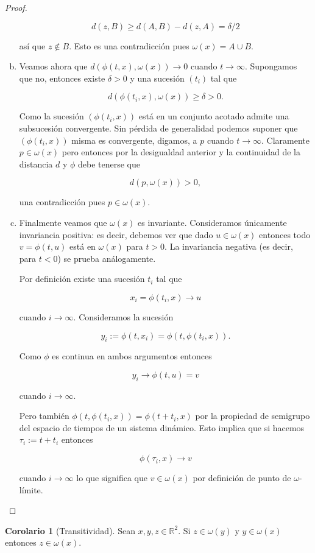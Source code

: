 \documentclass[11pt]{book}
\theoremstyle{definition}
\numberwithin{definition}{section}
\theoremstyle{theorem}
\newtheorem{corollary}{Corolario}
\numberwithin{theorem}{section}
\numberwithin{lemma}{section}
\numberwithin{corollary}{section}
\theoremstyle{plain}
\numberwithin{example}{section}
\newcommand{\R}{{\ensuremath{\mathbb{R}}}}
\begin{document}
\begin{proof}
\begin{enumerate}[(a)]
$$ d(z,B) \geq d(A,B) - d(z,A) = \delta/2$$

así que $z \notin B$. Esto es una contradicción pues $\omega(x) = A \cup B$.

\item Veamos ahora que $d(\phi(t,x), \omega(x)) \to 0$ cuando $t \to \infty$. Supongamos que no, entonces existe $\delta > 0$ y una sucesión $(t_i)$ tal que 

$$ d(\phi(t_i, x), \omega(x)) \geq \delta > 0.$$

Como la sucesión $(\phi(t_i, x))$ está en un conjunto acotado admite una subsucesión convergente. Sin pérdida de generalidad podemos suponer que $(\phi(t_i, x))$ misma es convergente, digamos, a $p$ cuando $t \to \infty$. Claramente $p \in \omega(x)$ pero entonces por la desigualdad anterior y la continuidad de la distancia $d$ y $\phi$ debe tenerse que

$$ d(p, \omega(x)) > 0,$$

una contradicción pues $p \in \omega(x)$.

\item Finalmente veamos que $\omega(x)$ es invariante. Consideramos únicamente invariancia positiva: es decir, debemos ver que dado $u \in \omega(x)$ entonces todo $v = \phi(t, u)$ está en $\omega(x)$ para $t > 0$. La invariancia negativa (es decir, para $t < 0$) se prueba análogamente.

Por definición existe una sucesión $t_i$ tal que

$$ x_i = \phi(t_i, x) \to u$$

cuando $i \to \infty$. Consideramos la sucesión

$$ y_i := \phi(t, x_i) = \phi(t, \phi(t_i, x)).$$

Como $\phi$ es continua en ambos argumentos entonces

$$ y_i \to \phi(t, u) = v$$

cuando $i \to \infty$.

Pero también $ \phi(t, \phi(t_i, x)) = \phi(t + t_i, x) $ por la propiedad de semigrupo del espacio de tiempos de un sistema dinámico. Esto implica que si hacemos $\tau_i := t + t_i$ entonces

$$ \phi(\tau_i, x) \to v$$

cuando $i \to \infty$ lo que significa que $v \in \omega(x)$ por definición de punto de $\omega$-límite.
\end{enumerate}
\end{proof}

\begin{corollary}[Transitividad] Sean $x,y,z \in \R^2$. Si $z \in \omega(y)$ y $y \in \omega(x)$ entonces $z \in \omega(x)$.
\end{corollary}
\end{document}
